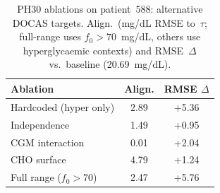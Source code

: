 \begin{table}[!htbp]
\caption{PH30 ablations on patient~588: alternative DOCAS targets.
Align.\ (mg/dL RMSE to~$\tau$; full-range uses $f_0>70$~mg/dL,
 others use hyperglycaemic contexts) and RMSE~$\Delta$ vs.\ baseline
 (20.69~mg/dL).}
\label{tab:ablation}
\begin{tabular*}{\tblwidth}{@{\extracolsep{\fill}}lcc@{}}
\toprule
Ablation & Align. & RMSE $\Delta$ \\
\midrule
Hardcoded (hyper only) & 2.89 & +5.36 \\
Independence & 1.49 & +0.95 \\
CGM interaction & 0.01 & +2.04 \\
CHO surface & 4.79 & +1.24 \\
Full range ($f_0>70$) & 2.47 & +5.76 \\
\bottomrule
\end{tabular*}
\end{table}
